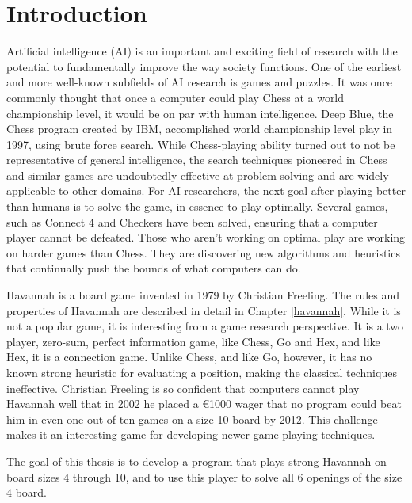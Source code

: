 

\section{Introduction}

Artificial intelligence (AI) is an important and exciting field of research with the potential to fundamentally improve the way society functions. One of the earliest and more well-known subfields of AI research is games and puzzles. It was once commonly thought that once a computer could play Chess at a world championship level, it would be on par with human intelligence. Deep Blue, the Chess program created by IBM, accomplished world championship level play in 1997, using brute force search. While Chess-playing ability turned out to not be representative of general intelligence, the search techniques pioneered in Chess and similar games are undoubtedly effective at problem solving and are widely applicable to other domains. For AI researchers, the next goal after playing better than humans is to solve the game, in essence to play optimally. Several games, such as Connect 4 and Checkers have been solved, ensuring that a computer player cannot be defeated. Those who aren't working on optimal play are working on harder games than Chess. They are discovering new algorithms and heuristics that  continually push the bounds of what computers can do.

Havannah is a board game invented in 1979 by Christian Freeling. The rules and properties of Havannah are described in detail in Chapter \ref{havannah}. While it is not a popular game, it is interesting from a game research perspective. It is a two player, zero-sum, perfect information game, like Chess, Go and Hex, and like Hex, it is a connection game. Unlike Chess, and like Go, however, it has no known strong heuristic for evaluating a position, making the classical techniques ineffective. Christian Freeling is so confident that computers cannot play Havannah well that in 2002 he placed a \euro 1000 wager that no program could beat him in even one out of ten games on a size 10 board by 2012. This challenge makes it an interesting game for developing newer game playing techniques.

The goal of this thesis is to develop a program that plays strong Havannah on board sizes 4 through 10, and to use this player to solve all 6 openings of the size 4 board.



